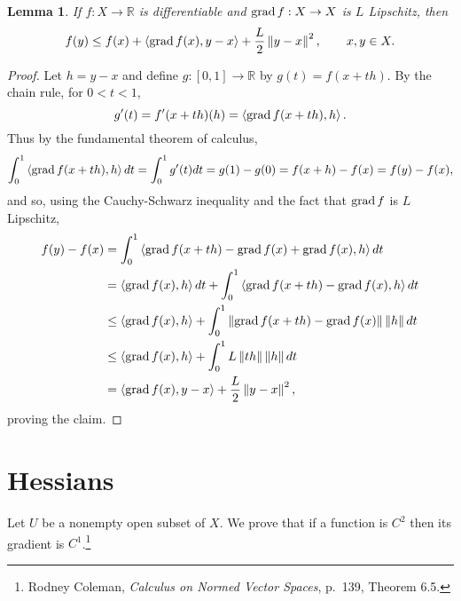 \documentclass{article}
\newcommand{\inner}[2]{\left\langle #1, #2 \right\rangle}
\newcommand{\grad}{\ensuremath\mathrm{grad}\,}
\newcommand{\norm}[1]{\left\Vert #1 \right\Vert}
\newtheorem{lemma}[theorem]{Lemma}
\theoremstyle{definition}
\begin{document}
\begin{lemma}
If $f:X \to \mathbb{R}$ is differentiable and $\grad f:X \to X$ is $L$ Lipschitz, then
\[
f(y) \leq f(x)+\inner{\grad f(x)}{y-x}+\frac{L}{2} \norm{y-x}^2,\qquad x,y \in X.
\]
\label{lipschitz}
\end{lemma}
\begin{proof}
Let $h=y-x$ and define $g:[0,1] \to \mathbb{R}$ by $g(t) = f(x+th)$. By the 
chain rule, for $0<t<1$,
\[
g'(t) = f'(x+th)(h) = \inner{\grad f(x+th)}{h}.
\]
Thus by the fundamental theorem of calculus,
\[
\int_0^1 \inner{\grad f(x+th)}{h} dt = \int_0^1 g'(t) dt = g(1)-g(0) = f(x+h)-f(x)=f(y)-f(x),
\]
and so, using the Cauchy-Schwarz inequality and the fact that $\grad f$ is $L$ Lipschitz,
\begin{align*}
f(y)-f(x)&= \int_0^1 \inner{\grad f(x+th)-\grad f(x)+\grad f(x)}{h} dt \\
&= \inner{\grad f(x)}{h} dt + \int_0^1 \inner{\grad f(x+th)-\grad f(x)}{h} dt\\
&\leq  \inner{\grad f(x)}{h}   +\int_0^1 \norm{\grad f(x+th)-\grad f(x)} \norm{h} dt\\
&\leq  \inner{\grad f(x)}{h} + \int_0^1 L \norm{th} \norm{h} dt\\
&=  \inner{\grad f(x)}{y-x} + \frac{L}{2} \norm{y-x}^2,
\end{align*}
proving the claim.
\end{proof}





\section{Hessians}
Let $U$ be a nonempty open subset of $X$. We prove that if a function is $C^2$ then its gradient is $C^1$.\footnote{Rodney Coleman, {\em Calculus on Normed Vector Spaces},
p.~139, Theorem 6.5.}
\end{document}
